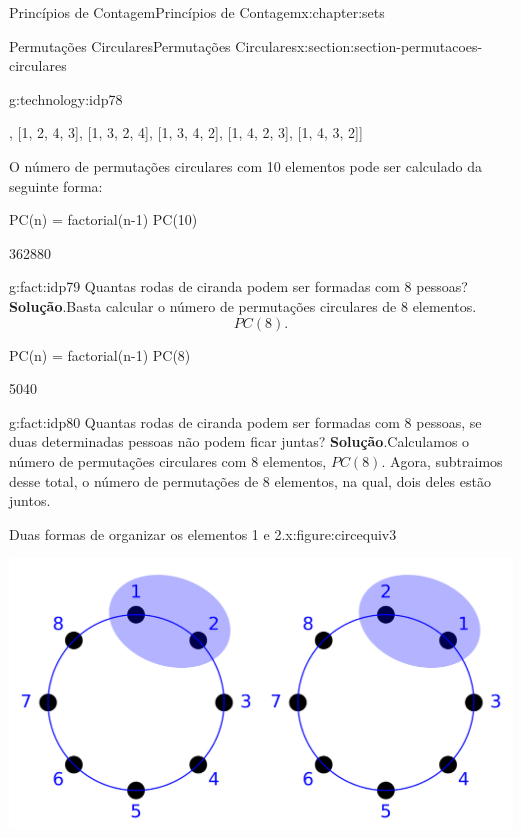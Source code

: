 \documentclass[oneside,10pt,]{book}
\newcommand{\blocktitlefont}{\relax}
\numberwithin{equation}{section}
\begin{document}
\begin{chapterptx}{Princípios de Contagem}{}{Princípios de Contagem}{}{}{x:chapter:sets}
\begin{sectionptx}{Permutações Circulares}{}{Permutações Circulares}{}{}{x:section:section-permutacoes-circulares}
\begin{technology}{}{g:technology:idp78}
\begin{sageoutput}
[[1, 2, 3, 4],
 [1, 2, 4, 3],
 [1, 3, 2, 4],
 [1, 3, 4, 2],
 [1, 4, 2, 3],
 [1, 4, 3, 2]]
\end{sageoutput}
%
\par
O número de permutações circulares com 10 elementos pode ser calculado da seguinte forma: \leavevmode%
\begin{sageinput}
PC(n) = factorial(n-1)
PC(10)
\end{sageinput}
\begin{sageoutput}
362880
\end{sageoutput}
%
\end{technology}
\begin{fact}{}{}{g:fact:idp79}%
Quantas rodas de ciranda podem ser formadas com 8 pessoas?%
\textbf{\blocktitlefont Solução}.\quad{}Basta calcular o número de permutações circulares de 8 elementos.%
\begin{equation*}
PC(8). 
\end{equation*}
\begin{sageinput}
PC(n) = factorial(n-1)
PC(8)
\end{sageinput}
\begin{sageoutput}
5040
\end{sageoutput}
\end{fact}
\begin{fact}{}{}{g:fact:idp80}%
Quantas rodas de ciranda podem ser formadas com 8 pessoas, se duas determinadas pessoas não podem ficar juntas?%
\textbf{\blocktitlefont Solução}.\quad{}Calculamos o número de permutações circulares com 8 elementos, \(PC(8)\). Agora, subtraimos desse total, o número de permutações de 8 elementos, na qual, dois deles estão juntos.%
\begin{figureptx}{Duas formas de organizar os elementos 1 e 2.}{x:figure:circequiv3}{}%
\begin{image}{0.1}{0.8}{0.1}%
\includegraphics[width=\linewidth]{images/circ-equiv3}

\end{image}
\end{figureptx}
\end{fact}
\end{sectionptx}
\end{chapterptx}
\end{document}
